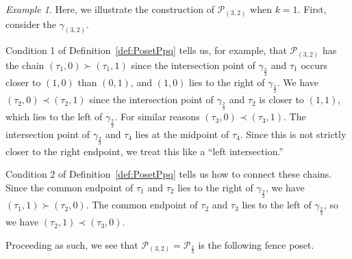\documentclass{article}
\theoremstyle{remark}
\newtheorem{example}[theorem]{Example}
\newcommand{\calP}{\mathcal{P}}
\begin{document}
\begin{example}\label{ex:P_{3,2}}
Here, we illustrate the construction of $\calP_{(3,2)}$ when $k= 1$. First, consider the $\gamma_{(3,2)}$.
\begin{center}
\end{center}

Condition 1 of Definition~\ref{def:PosetPpq} tells us, for example, that $\calP_{(3,2)}$ has the chain $(\tau_1,0) \succ (\tau_1,1)$ since the intersection point of $\gamma_{\frac23}$ and $\tau_1$ occurs closer to $(1,0)$ than $(0,1)$, and $(1,0)$ lies to the right of $\gamma_{\frac23}$. We have $(\tau_2,0) \prec (\tau_2,1)$ since the intersection point of $\gamma_{\frac23}$ and $\tau_2$ is closer to $(1,1)$, which lies to the left of $\gamma_{\frac23}$. For similar reasons $(\tau_3,0) \prec (\tau_3,1)$. The intersection point of $\gamma_{\frac23}$ and $\tau_4$ lies at the midpoint of $\tau_4$. Since this is not strictly closer to the right endpoint, we treat this like a ``left intersection.''

Condition 2 of Definition~\ref{def:PosetPpq} tells us how to connect these chains. Since the common endpoint of $\tau_1$ and $\tau_2$ lies to the right of $\gamma_{\frac23}$, we have $(\tau_1,1) \succ (\tau_2,0)$. The common endpoint of $\tau_2$ and $\tau_3$ lies to the left of $\gamma_{\frac23}$, so we have $(\tau_2,1) \prec (\tau_3,0)$.

Proceeding as such, we see that $\calP_{(3,2)} = \calP_{\frac23}$ is the following fence poset. 

\begin{center}
\end{center}


\end{example}
\end{document}
